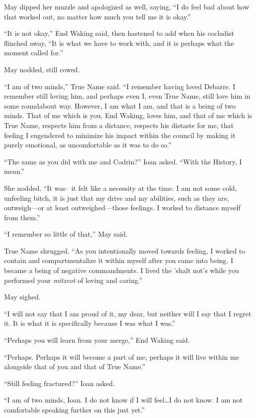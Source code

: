 May dipped her muzzle and apologized as well, saying, ``I do feel bad about how that worked out, no matter how much you tell me it is okay.''

``It is not okay,'' End Waking said, then hastened to add when his cocladist flinched away, ``It is what we have to work with, and it is perhaps what the moment called for.''

May nodded, still cowed.

``I am of two minds,'' True Name said. ``I remember having loved Debarre. I remember still loving him, and perhaps even I, even True Name, still love him in some roundabout way. However, I am what I am, and that is a being of two minds. That of me which is you, End Waking, loves him, and that of me which is True Name, respects him from a distance, respects his distaste for me, that feeling I engendered to minimize his impact within the council by making it purely emotional, as uncomfortable as it was to do so.''

``The same as you did with me and Codrin?'' Ioan asked. ``With the History, I mean.''

She nodded. ``It was-- it felt like a necessity at the time. I am not some cold, unfeeling bitch, it is just that my drive and my abilities, such as they are, outweigh—or at least outweighed—those feelings. I worked to distance myself from them.''

``I remember so little of that,'' May said.

True Name shrugged. ``As you intentionally moved towards feeling, I worked to contain and compartmentalize it within myself after you came into being. I became a being of negative commandments. I lived the 'shalt not's while you performed your \emph{mitzvot} of loving and caring.''

May sighed.

``I will not say that I am proud of it, my dear, but neither will I say that I regret it. It is what it is specifically because I was what I was.''

``Perhaps you will learn from your merge,'' End Waking said.

``Perhaps. Perhaps it will become a part of me, perhaps it will live within me alongside that of you and that of True Name.''

``Still feeling fractured?'' Ioan asked.

``I am of two minds, Ioan. I do not know if I will feel\ldots I do not know. I am not comfortable speaking further on this just yet.''

